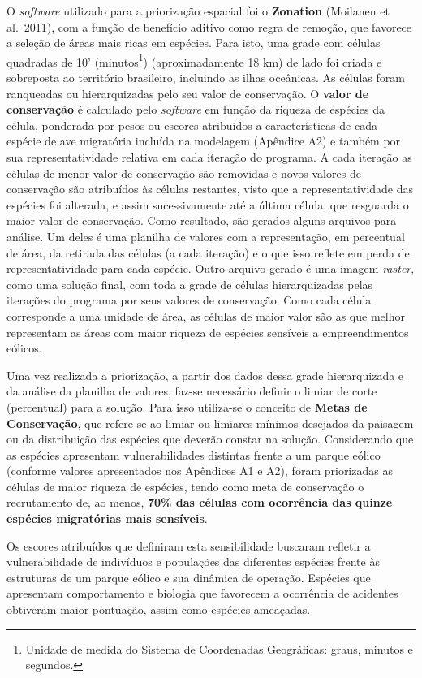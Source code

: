 \documentclass[
  oneside]{scrbook}
\begin{document}
O \emph{software} utilizado para a priorização espacial foi o \textbf{Zonation} (Moilanen et al.~2011), com a função de benefício aditivo como regra de remoção, que favorece a seleção de áreas mais ricas em espécies. Para isto, uma grade com células quadradas de 10' (minutos\footnote{Unidade de medida do Sistema de Coordenadas Geográficas: graus, minutos e segundos.}) (aproximadamente 18 km) de lado foi criada e sobreposta ao território brasileiro, incluindo as ilhas oceânicas. As células foram ranqueadas ou hierarquizadas pelo seu valor de conservação. O \textbf{valor de conservação} é calculado pelo \emph{software} em função da riqueza de espécies da célula, ponderada por pesos ou escores atribuídos a características de cada espécie de ave migratória incluída na modelagem (Apêndice A2) e também por sua representatividade relativa em cada iteração do programa. A cada iteração as células de menor valor de conservação são removidas e novos valores de conservação são atribuídos às células restantes, visto que a representatividade das espécies foi alterada, e assim sucessivamente até a última célula, que resguarda o maior valor de conservação. Como resultado, são gerados alguns arquivos para análise. Um deles é uma planilha de valores com a representação, em percentual de área, da retirada das células (a cada iteração) e o que isso reflete em perda de representatividade para cada espécie. Outro arquivo gerado é uma imagem \emph{raster}, como uma solução final, com toda a grade de células hierarquizadas pelas iterações do programa por seus valores de conservação. Como cada célula corresponde a uma unidade de área, as células de maior valor são as que melhor representam as áreas com maior riqueza de espécies sensíveis a empreendimentos eólicos.

Uma vez realizada a priorização, a partir dos dados dessa grade hierarquizada e da análise da planilha de valores, faz-se necessário definir o limiar de corte (percentual) para a solução. Para isso utiliza-se o conceito de \textbf{Metas de Conservação}, que refere-se ao limiar ou limiares mínimos desejados da paisagem ou da distribuição das espécies que deverão constar na solução. Considerando que as espécies apresentam vulnerabilidades distintas frente a um parque eólico (conforme valores apresentados nos Apêndices A1 e A2), foram priorizadas as células de maior riqueza de espécies, tendo como meta de conservação o recrutamento de, ao menos, \textbf{70\% das células com ocorrência das quinze espécies migratórias mais sensíveis}.

Os escores atribuídos que definiram esta sensibilidade buscaram refletir a vulnerabilidade de indivíduos e populações das diferentes espécies frente às estruturas de um parque eólico e sua dinâmica de operação. Espécies que apresentam comportamento e biologia que favorecem a ocorrência de acidentes obtiveram maior pontuação, assim como espécies ameaçadas.
\end{document}
